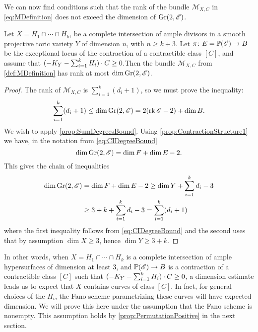 We can now find conditions such that the rank of the bundle $\mathscr{M}_{X,C}$ in \eqref{eq:MDefinition} does not exceed the dimension of $\operatorname{Gr}(2,\mathscr{E})$.
\begin{corollary}
	\label{cor:NonNegExpDim}
	Let $X = H_1 \cap \cdots \cap H_k$, be a complete intersection of ample divisors in a smooth projective toric variety $Y$ of dimension $n$, with $n \geq k+3$. Let $\pi \colon  E = \mathbb{P}(\mathscr{E}) \to B$ be the exceptional locus of the contraction of a contractible class $[C]$, and assume that $(-K_Y - \sum_{i=1}^kH_i) \cdot C \geq 0$.Then the bundle $\mathscr{M}_{X,C}$ from \cref{def:MDefinition} has rank at most $\dim \operatorname{Gr}(2,\mathscr{E})$.
\end{corollary}
\begin{proof}
	The rank of $\mathscr{M}_{X,C}$ is $\sum_{i=1}^k(d_i+1)$, so we must prove the inequality:
	\begin{equation}
		\label{eq:CIDegreeBound2}
		\sum_{i=1}^k (d_i + 1) \leq \dim \operatorname{Gr}(2,\mathscr{E}) = 2(\operatorname{rk} \mathscr{E} - 2) + \dim B.
	\end{equation}
        We wish to apply \cref{prop:SumDegreesBound}. Using \cref{prop:ContractionStructure1} we have, in the notation from \eqref{eq:CIDegreeBound} \[\dim \operatorname{Gr}(2,\mathscr{E}) = \dim F + \dim E - 2.\]
         This gives the chain of inequalities
         \begin{align*}
         	\dim \operatorname{Gr}(2,\mathscr{E}) &= \dim F + \dim E - 2 \geq \dim Y + \sum_{i=1}^k d_i - 3 \\
         	&\geq 3+k+\sum_{i=1}^k d_i - 3 = \sum_{i=1}^k(d_i+1)
         \end{align*}
        where the first inequality follows from \eqref{eq:CIDegreeBound} and the second uses that by assumption $\dim X \geq 3$, hence $\dim Y \geq 3+k$.
\end{proof}
 In other words, when $X = H_1 \cap \cdots \cap H_k$ is a complete intersection of ample hypersurfaces of dimension at least 3, and $\mathbb{P}(\mathscr{E}) \to B$ is a contraction of a contractible class $[C]$ such that $(-K_Y - \sum_{i=1}^kH_i) \cdot C \geq 0$, a dimension estimate leads us to expect that $X$ contains curves of class $[C]$. In fact, for general choices of the $H_i$, the Fano scheme parametrizing these curves will have expected dimension. We will prove this here under the assumption that the Fano scheme is nonempty. This assumption holds by \cref{prop:PermutationPositive} in the next section.


